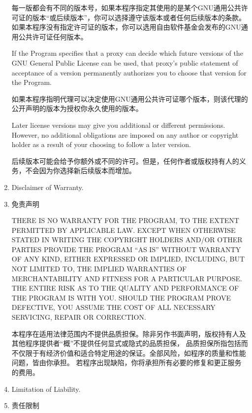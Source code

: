 \documentclass[11pt]{article}
\begin{document}
\begin{enumerate}
        每一版都会有不同的版本号，如果本程序指定其使用的是某个GNU通用公共许可证的版本“或后续版本”，你可以选择遵守该版本或者任何后续版本的条款。
        如果本程序没有指定许可证的版本，你可以选用自由软件基金会发布的GNU通用公共许可证任何版本。

        If the Program specifies that a proxy can decide which future
        versions of the GNU General Public License can be used, that proxy's
        public statement of acceptance of a version permanently authorizes you
        to choose that version for the Program.

        如果本程序指明代理可以决定使用GNU通用公共许可证哪个版本，则该代理的公开声明的版本为授权你永久使用的版本。

        Later license versions may give you additional or different
        permissions.  However, no additional obligations are imposed on any
        author or copyright holder as a result of your choosing to follow a
        later version.

        后续版本可能会给予你额外或不同的许可。但是，任何作者或版权持有人的义务，不会因为你选择新后续版本而增加。

  \item Disclaimer of Warranty.
  \item 免责声明

        \begin{sloppypar}
          THERE IS NO WARRANTY FOR THE PROGRAM, TO THE EXTENT PERMITTED BY
          APPLICABLE LAW.  EXCEPT WHEN OTHERWISE STATED IN WRITING THE
          COPYRIGHT HOLDERS AND/OR OTHER PARTIES PROVIDE THE PROGRAM ``AS IS''
          WITHOUT WARRANTY OF ANY KIND, EITHER EXPRESSED OR IMPLIED,
          INCLUDING, BUT NOT LIMITED TO, THE IMPLIED WARRANTIES OF
          MERCHANTABILITY AND FITNESS FOR A PARTICULAR PURPOSE.  THE ENTIRE
          RISK AS TO THE QUALITY AND PERFORMANCE OF THE PROGRAM IS WITH YOU.
          SHOULD THE PROGRAM PROVE DEFECTIVE, YOU ASSUME THE COST OF ALL
          NECESSARY SERVICING, REPAIR OR CORRECTION.

          本程序在适用法律范围内不提供品质担保。除非另作书面声明，版权持有人及其他程序提供者“概”不提供任何显式或隐式的品质担保，
          品质担保所指包括而不仅限于有经济价值和适合特定用途的保证。全部风险，如程序的质量和性能问题，皆由你承担。
          若程序出现缺陷，你将承担所有必要的修复和更正服务的费用。

        \end{sloppypar}

  \item Limitation of Liability.
  \item 责任限制


\end{enumerate}
\end{document}
